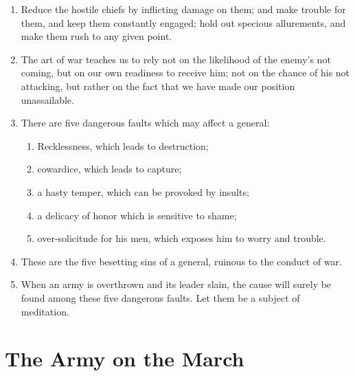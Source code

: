 \begin{enumerate}
\item Reduce the hostile chiefs by inflicting damage on them; and make
  trouble for them, and keep them constantly engaged; hold out
  specious allurements, and make them rush to any given point.

\item The art of war teaches us to rely not on the likelihood of the
  enemy's not coming, but on our own readiness to receive him; not on
  the chance of his not attacking, but rather on the fact that we have
  made our position unassailable.

\item There are five dangerous faults which may affect a general:
  \begin{enumerate}
  \item Recklessness, which leads to destruction; \item cowardice,
    which leads to capture; \item a hasty temper, which can be
    provoked by insults;
  \item a delicacy of honor which is sensitive to shame; \item
    over-solicitude for his men, which exposes him to worry and
    trouble.
  \end{enumerate}
\item These are the five besetting sins of a general, ruinous to the
  conduct of war.

\item When an army is overthrown and its leader slain, the cause will
  surely be found among these five dangerous faults. Let them be a
  subject of meditation.

\end{enumerate}
\addtocounter{chapter}{1}\chapter*{The Army on the March}
